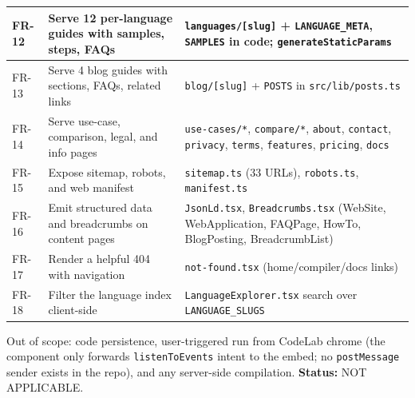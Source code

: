 \begin{table}[H]
\begin{tabular}{|l|p{6cm}|p{5.5cm}|}
FR-12 & Serve 12 per-language guides with samples, steps, FAQs & \texttt{languages/[slug]} + \texttt{LANGUAGE\_META}, \texttt{SAMPLES} in code; \texttt{generateStaticParams} \\ \hline
FR-13 & Serve 4 blog guides with sections, FAQs, related links & \texttt{blog/[slug]} + \texttt{POSTS} in \texttt{src/lib/posts.ts} \\ \hline
FR-14 & Serve use-case, comparison, legal, and info pages & \texttt{use-cases/*}, \texttt{compare/*}, \texttt{about}, \texttt{contact}, \texttt{privacy}, \texttt{terms}, \texttt{features}, \texttt{pricing}, \texttt{docs} \\ \hline
FR-15 & Expose sitemap, robots, and web manifest & \texttt{sitemap.ts} (33 URLs), \texttt{robots.ts}, \texttt{manifest.ts} \\ \hline
FR-16 & Emit structured data and breadcrumbs on content pages & \texttt{JsonLd.tsx}, \texttt{Breadcrumbs.tsx} (WebSite, WebApplication, FAQPage, HowTo, BlogPosting, BreadcrumbList) \\ \hline
FR-17 & Render a helpful 404 with navigation & \texttt{not-found.tsx} (home/compiler/docs links) \\ \hline
FR-18 & Filter the language index client-side & \texttt{LanguageExplorer.tsx} search over \texttt{LANGUAGE\_SLUGS} \\ \hline
\end{tabular}
\end{table}

Out of scope: code persistence, user-triggered run from CodeLab chrome (the component only forwards \texttt{listenToEvents} intent to the embed; no \texttt{postMessage} sender exists in the repo), and any server-side compilation. \textbf{Status:} NOT APPLICABLE.

